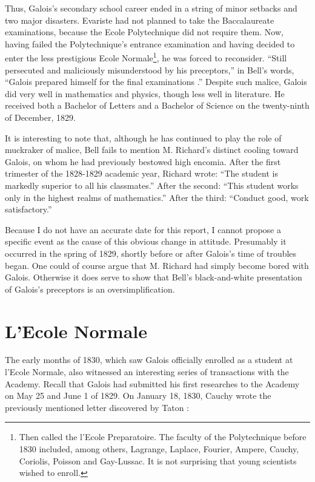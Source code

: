 \documentclass[12pt]{article}
\begin{document}
Thus, Galois's secondary school career ended in a string of minor setbacks and two major disasters. Evariste had not planned to take the Baccalaureate examinations, because the Ecole Polytechnique did not require them. Now, having failed the Polytechnique's entrance examination and having decided to enter the less prestigious Ecole Normale\footnote{Then called the l'Ecole Preparatoire. The faculty of the Polytechnique before 1830 included, among others, Lagrange, Laplace, Fourier, Ampere, Cauchy, Coriolis, Poisson and Gay-Lussac. It is not surprising that young scientists wished to enroll.}, he was forced to reconsider. ``Still persecuted and maliciously misunderstood by his preceptors,'' in Bell's words, ``Galois prepared himself for the final examinations \cite{31}.'' Despite such malice, Galois did very well in mathematics and physics, though less well in literature. He received both a Bachelor of Letters and a Bachelor of Science on the twenty-ninth of December, 1829.

It is interesting to note that, although he has continued to play the role of muckraker of malice, Bell fails to mention M. Richard's distinct cooling toward Galois, on whom he had previously bestowed high encomia. After the first trimester of the 1828-1829 academic year, Richard wrote: ``The student is markedly superior to all his classmates.'' After the second: ``This student works only in the highest realms of mathematics.'' After the third: ``Conduct good, work satisfactory.''

Because I do not have an accurate date for this report, I cannot propose a specific event as the cause of this obvious change in attitude. Presumably it occurred in the spring of 1829, shortly before or after Galois's time of troubles began. One could of course argue that M. Richard had simply become bored with Galois. Otherwise it does serve to show that Bell's black-and-white presentation of Galois's preceptors is an oversimplification.

\section{L'Ecole Normale}

The early months of 1830, which saw Galois officially enrolled as a student at l'Ecole Normale, also witnessed an interesting series of transactions with the Academy. Recall that Galois had submitted his first researches to the Academy on May 25 and June 1 of 1829. On January 18, 1830, Cauchy wrote the previously mentioned letter discovered by Taton \cite{32}:
\end{document}
